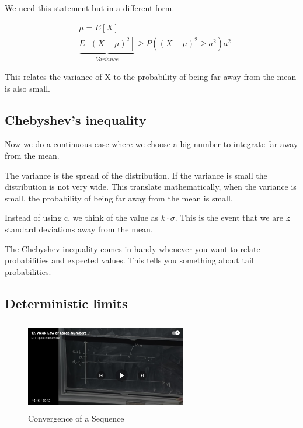 We need this statement but in a different form.


\begin{align*}
&\mu = E[X]\\
&    \underbrace{E[(X - \mu)^2]}_{Variance} \ge P((X - \mu)^2 \ge a^2) a^2
\end{align*}

 This relates the variance of X to the probability of being far away from the mean is also small.

\subsection{Chebyshev’s inequality}


Now we do a continuous case where we choose a big number to integrate far away from the mean.

 The variance is the spread of the distribution. If the variance is small the distribution is not very wide.  This translate mathematically, when the variance is small, the probability of being far away from the mean is small.

Instead of using c, we think of the value as $k\cdot \sigma$.  This is the event that we are k standard deviations away from the mean.

The Chebyshev inequality comes in handy whenever you want to relate probabilities and expected values.  This tells you something about tail probabilities.

\subsection{Deterministic limits}



\begin{figure}[ht]
\centering
\includegraphics[width=7cm, height=4cm]{images/L19/IMG_3316.jpeg}
\caption{Convergence of a Sequence}
\end{figure}

